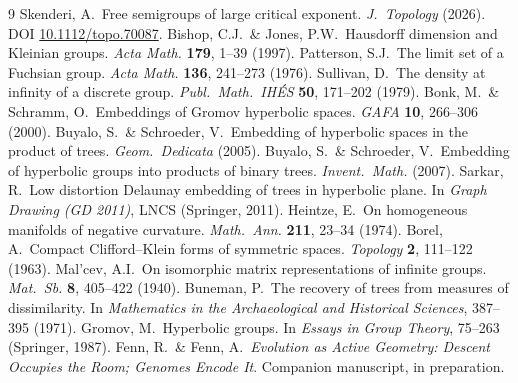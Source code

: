 \documentclass[11pt,reqno]{amsart}
\theoremstyle{plain}
\theoremstyle{definition}
\begin{document}
\begin{thebibliography}{9}\small
{} Skenderi, A.\ Free semigroups of large critical exponent. \emph{J.\ Topology} (2026). DOI \href{https://doi.org/10.1112/topo.70087}{10.1112/topo.70087}.
 Bishop, C.J.\ \& Jones, P.W.\ Hausdorff dimension and Kleinian groups. \emph{Acta Math.} \textbf{179}, 1--39 (1997).
 Patterson, S.J.\ The limit set of a Fuchsian group. \emph{Acta Math.} \textbf{136}, 241--273 (1976).
 Sullivan, D.\ The density at infinity of a discrete group. \emph{Publ.\ Math.\ IH\'ES} \textbf{50}, 171--202 (1979).
 Bonk, M.\ \& Schramm, O.\ Embeddings of Gromov hyperbolic spaces. \emph{GAFA} \textbf{10}, 266--306 (2000).
 Buyalo, S.\ \& Schroeder, V.\ Embedding of hyperbolic spaces in the product of trees. \emph{Geom.\ Dedicata} (2005).
 Buyalo, S.\ \& Schroeder, V.\ Embedding of hyperbolic groups into products of binary trees. \emph{Invent.\ Math.} (2007).
 Sarkar, R.\ Low distortion Delaunay embedding of trees in hyperbolic plane. In \emph{Graph Drawing (GD 2011)}, LNCS (Springer, 2011).
 Heintze, E.\ On homogeneous manifolds of negative curvature. \emph{Math.\ Ann.} \textbf{211}, 23--34 (1974).
 Borel, A.\ Compact Clifford--Klein forms of symmetric spaces. \emph{Topology} \textbf{2}, 111--122 (1963).
 Mal'cev, A.I.\ On isomorphic matrix representations of infinite groups. \emph{Mat.\ Sb.} \textbf{8}, 405--422 (1940).
 Buneman, P.\ The recovery of trees from measures of dissimilarity. In \emph{Mathematics in the Archaeological and Historical Sciences}, 387--395 (1971).
 Gromov, M.\ Hyperbolic groups. In \emph{Essays in Group Theory}, 75--263 (Springer, 1987).
 Fenn, R.\ \& Fenn, A.\ \emph{Evolution as Active Geometry: Descent Occupies the Room; Genomes Encode It}. Companion manuscript, in preparation.
\end{thebibliography}
\end{document}
